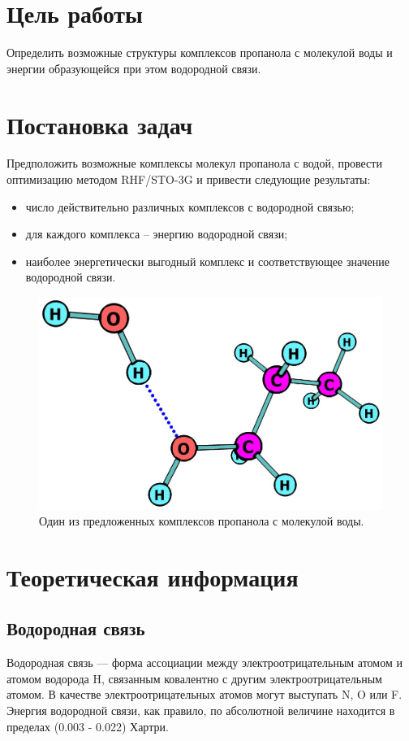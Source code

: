 \section{Цель работы}
Определить возможные структуры комплексов пропанола с молекулой воды и энергии образующейся при этом водородной связи.

\newpage
\section{Постановка задач}
Предположить возможные комплексы молекул пропанола с водой, провести оптимизацию методом RHF/STO-3G и привести следующие результаты: 
\begin{itemize}
    \item число действительно различных комплексов с водородной связью;
    \item для каждого комплекса -- энергию водородной связи;
    \item наиболее энергетически выгодный комплекс и соответствующее значение водородной связи.
\end{itemize}

\begin{figure}[H]
\centering
\captionsetup{justification=centering}
\includegraphics[scale=0.4]{fig/0.jpg}
\caption{Один из предложенных комплексов пропанола с молекулой воды.}
\end{figure}

\newpage
\section{Теоретическая информация}
\subsection{Водородная связь}
Водородная связь — форма ассоциации между электроотрицательным атомом и атомом водорода H, связанным ковалентно с другим электроотрицательным атомом. В качестве электроотрицательных атомов могут выступать N, O или F. Энергия водородной связи, как правило, по абсолютной величине находится в пределах (0.003 - 0.022) Хартри.

